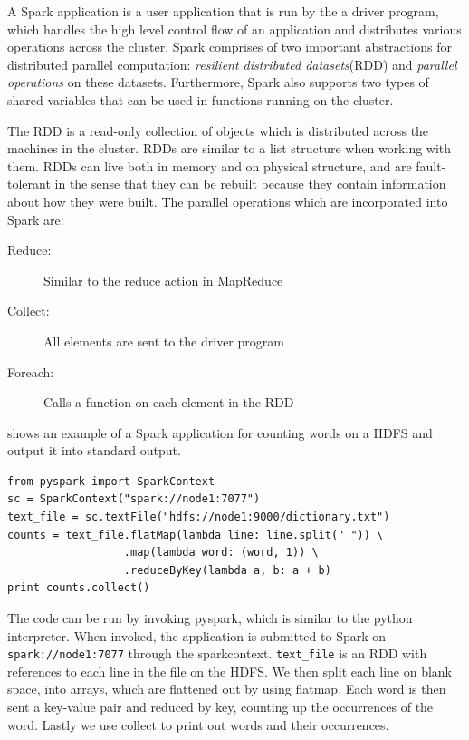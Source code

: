 A Spark application is a user application that is run by the a driver program, which handles the high level control flow of an application and distributes various operations across the cluster. Spark comprises of two important abstractions for distributed parallel computation: \emph{resilient distributed datasets}(RDD) and \emph{parallel operations} on these datasets. Furthermore, Spark also supports two types of shared variables that can be used in functions running on the cluster.

The RDD is a read-only collection of objects which is distributed across the machines in the cluster. RDDs are similar to a list structure when working with them. RDDs can live both in memory and on physical structure, and are fault-tolerant in the sense that they can be rebuilt because they contain information about how they were built. The parallel operations which are incorporated into Spark are: 
\begin{description}
  \item[Reduce:] Similar to the reduce action in MapReduce 
  \item[Collect:] All elements are sent to the driver program
  \item[Foreach:] Calls a function on each element in the RDD
\end{description}
 shows an example of a Spark application for counting words on a HDFS and output it into standard output.

\begin{lstlisting}[caption={Wordcount in Spark on HDFS},label={lst:wordcount},belowcaptionskip=4pt]
from pyspark import SparkContext
sc = SparkContext("spark://node1:7077")
text_file = sc.textFile("hdfs://node1:9000/dictionary.txt")
counts = text_file.flatMap(lambda line: line.split(" ")) \
                  .map(lambda word: (word, 1)) \
                  .reduceByKey(lambda a, b: a + b)
print counts.collect()
\end{lstlisting} 
The code can be run by invoking pyspark, which is similar to the python interpreter. When invoked, the application is submitted to Spark on \texttt{spark://node1:7077} through the sparkcontext. \texttt{text\_file} is an RDD with references to each line in the file on the HDFS. We then split each line on blank space, into arrays, which are flattened out by using flatmap. Each word is then sent a key-value pair and reduced by key, counting up the occurrences of the word. Lastly we use collect to print out words and their occurrences.




